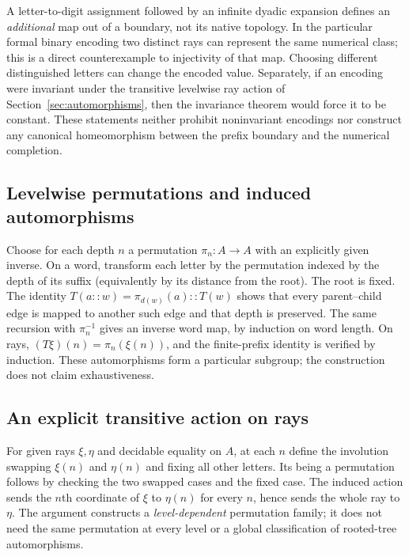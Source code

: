 A letter-to-digit assignment followed by an infinite dyadic expansion defines an \emph{additional} map out of a boundary, not its native topology. In the particular formal binary encoding two distinct rays can represent the same numerical class; this is a direct counterexample to injectivity of that map. Choosing different distinguished letters can change the encoded value. Separately, if an encoding were invariant under the transitive levelwise ray action of Section~\ref{sec:automorphisms}, then the invariance theorem would force it to be constant. These statements neither prohibit noninvariant encodings nor construct any canonical homeomorphism between the prefix boundary and the numerical completion.

\subsection{Levelwise permutations and induced automorphisms}\label{supp:11-1}
\par{}\par\smallskip

Choose for each depth $n$ a permutation $\pi_n:A\to A$ with an explicitly given inverse. On a word, transform each letter by the permutation indexed by the depth of its suffix (equivalently by its distance from the root). The root is fixed. The identity $T(a::w)=\pi_{d(w)}(a)::T(w)$ shows that every parent--child edge is mapped to another such edge and that depth is preserved. The same recursion with $\pi_n^{-1}$ gives an inverse word map, by induction on word length. On rays, $(T\xi)(n)=\pi_n(\xi(n))$, and the finite-prefix identity is verified by induction. These automorphisms form a particular subgroup; the construction does not claim exhaustiveness.

\subsection{An explicit transitive action on rays}\label{supp:11-2}
\par{}\par\smallskip

For given rays $\xi,\eta$ and decidable equality on $A$, at each $n$ define the involution swapping $\xi(n)$ and $\eta(n)$ and fixing all other letters. Its being a permutation follows by checking the two swapped cases and the fixed case. The induced action sends the $n$th coordinate of $\xi$ to $\eta(n)$ for every $n$, hence sends the whole ray to $\eta$. The argument constructs a \emph{level-dependent} permutation family; it does not need the same permutation at every level or a global classification of rooted-tree automorphisms.

